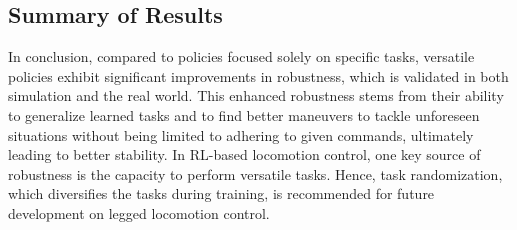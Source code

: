\subsection{Summary of Results}
In conclusion, compared to policies focused solely on specific tasks, versatile policies exhibit significant improvements in robustness, which is validated in both simulation and the real world. 
This enhanced robustness stems from their ability to generalize learned tasks and to find better maneuvers to tackle unforeseen situations without being limited to adhering to given commands, ultimately leading to better stability. 
In RL-based locomotion control, one key source of robustness is the capacity to perform versatile tasks. 
Hence, task randomization, which diversifies the tasks during training, is recommended for future development on legged locomotion control.